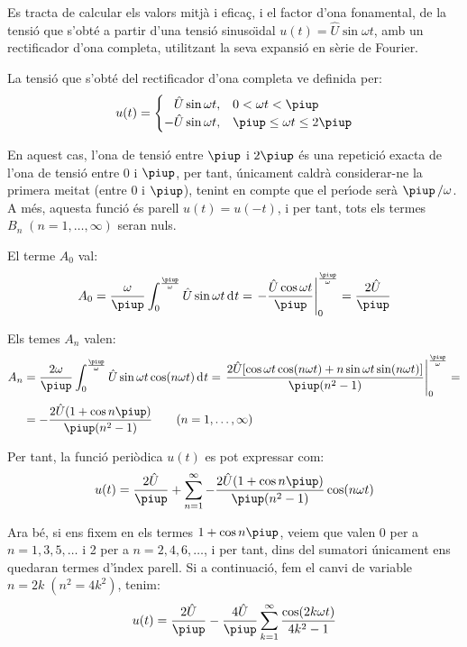 \begin{exemple}
Es tracta de calcular els valors mitj\`{a} i efica\c{c}, i el factor d'ona
fonamental, de la tensi\'{o} que s'obt\'{e} a partir d'una tensi\'{o}
sinuso\"{\i}dal $u(t) = \hat{U} \sin\omega t$, amb un rectificador d'ona
completa, utilitzant la seva expansi\'{o} en s\`{e}rie de Fourier.

La tensi\'{o} que s'obt\'{e} del rectificador d'ona completa ve definida
per:
\[
u(t) = \begin{cases} \phantom{-}\hat{U} \sin\omega t, & 0 < \omega t < \piup\\
       -\hat{U} \sin\omega t, & \piup \leq \omega t \leq 2\piup \end{cases}
\]

En aquest cas, l'ona de tensi\'{o} entre $\piup$ i $2\piup$ \'{e}s una repetici\'{o}
exacta de l'ona de tensi\'{o} entre 0 i $\piup$, per tant, \'{u}nicament
caldr\`{a} considerar-ne la primera meitat (entre 0 i $\piup$), tenint en
compte que el per\'{\i}ode ser\`{a} $\piup\,/\omega$. A m\'{e}s, aquesta funci\'{o} \'{e}s
parell $u(t) = u(-t)$, i per tant, tots els termes
$B_n\;(n=1,\ldots,\infty)$ seran nuls.

El terme $A_0$ val:
\[
A_0 = \frac{\omega}{\piup} \int_0^{\frac{\piup}{\omega}} \hat{U} \sin
\omega t \diff t = \left. -\frac{\hat{U} \cos \omega t}{\piup}
\right|_0^{\frac{\piup}{\omega}} = \frac{2\hat{U}}{\piup}
\]

Els temes $A_n$ valen:
\[
\begin{split}
A_n &= \frac{2 \omega}{\piup} \int_0^{\frac{\piup}{\omega}} \hat{U} \sin
\omega t \cos(n \omega t)\diff t = \left. \frac{2 \hat{U}[ \cos
\omega t \cos (n \omega t) + n \sin \omega t \sin(n \omega
t)]}{\piup(n^2-1)} \right|_0^{\frac{\piup}{\omega}}=\\[0.5ex]
&= -\frac{2\hat{U}(1+\cos n \piup)}{\piup(n^2-1)}
\qquad(n=1,\ldots,\infty)
\end{split}
\]

Per tant, la funci\'{o} peri\`{o}dica $u(t)$ es pot expressar com:
\[
    u(t) = \frac{2\hat{U}}{\piup} + \sum_{n=1}^\infty
     -\frac{2\hat{U}(1+\cos n \piup)}{\piup(n^2-1)} \cos(n \omega t)
\]

Ara b\'{e}, si ens fixem en els termes $1+\cos n \piup$, veiem que valen 0
per a $n=1,3,5,\ldots$ i 2 per a $n=2,4,6,\ldots$, i per tant, dins
del sumatori \'{u}nicament ens quedaran termes d'\'{\i}ndex parell. Si a
continuaci\'{o}, fem el canvi de variable $n=2k\;(n^2=4k^2)$, tenim:
\[
u(t) = \frac{2\hat{U}}{\piup} - \frac{4\hat{U}}{\piup} \sum_{k=1}^\infty
      \frac{\cos(2 k \omega t)}{4k^2-1}
\]


\end{exemple}
